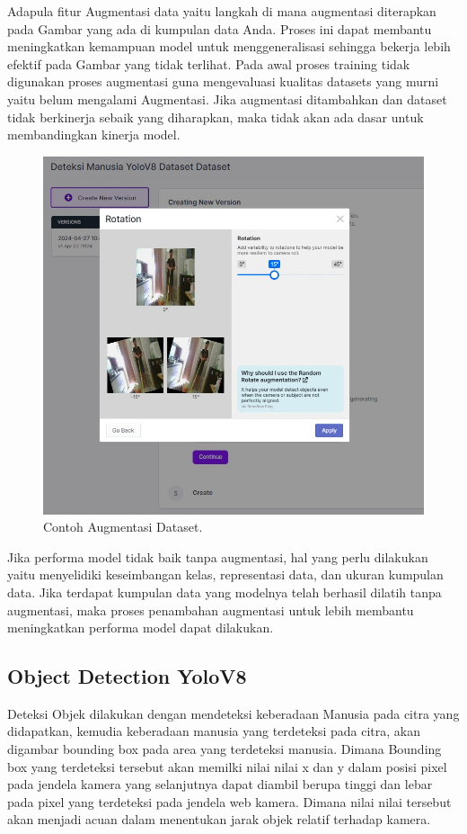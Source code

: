 Adapula fitur Augmentasi data yaitu langkah di mana augmentasi diterapkan pada Gambar yang ada di kumpulan data Anda. Proses ini dapat membantu meningkatkan kemampuan model untuk menggeneralisasi sehingga bekerja lebih efektif pada Gambar yang tidak terlihat. Pada awal proses training tidak digunakan proses augmentasi guna mengevaluasi kualitas datasets yang murni yaitu belum mengalami Augmentasi. Jika augmentasi ditambahkan dan dataset tidak berkinerja sebaik yang diharapkan, maka tidak akan ada dasar untuk membandingkan kinerja model. 

\begin{figure}[H]
  \centering
  \includegraphics[scale=0.4]{gambar/roboflow augmentasi.jpg}
  \caption{Contoh Augmentasi Dataset.}
  \label{fig:Mengaugmentasi dataset ke roboflow}
\end{figure}

Jika performa model tidak baik tanpa augmentasi, hal yang perlu dilakukan yaitu menyelidiki keseimbangan kelas, representasi data, dan ukuran kumpulan data. Jika terdapat kumpulan data yang modelnya telah berhasil dilatih tanpa augmentasi, maka proses penambahan augmentasi untuk lebih membantu meningkatkan performa model dapat dilakukan.

\subsection{Object Detection YoloV8}
Deteksi Objek dilakukan dengan mendeteksi keberadaan Manusia pada citra yang didapatkan, kemudia keberadaan manusia yang terdeteksi pada citra, akan digambar bounding box pada area yang terdeteksi manusia. Dimana Bounding box yang terdeteksi tersebut akan memilki nilai nilai x dan y dalam posisi pixel pada jendela kamera yang selanjutnya dapat diambil berupa tinggi dan lebar pada pixel yang terdeteksi pada jendela web kamera. Dimana nilai nilai tersebut akan menjadi acuan dalam menentukan jarak objek relatif terhadap kamera. 

